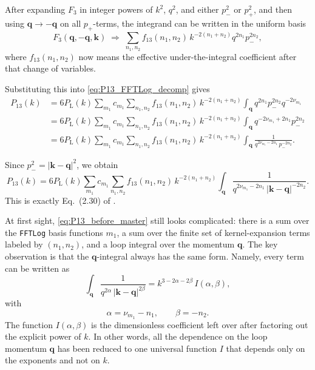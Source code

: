 \documentclass[a4paper,11pt]{article}
\newcommand{\codefont}[1]{{\texttt{#1}}}
\def\Plin{P_{\rm L}}
\newcommand{\<}{\langle}
\renewcommand{\>}{\rangle}
\def\Plin{P_\text{L}}
\begin{document}
After expanding \(F_3\) in integer powers of \(k^2\), \(q^2\), and either \(p_-^2\) or \(p_+^2\), and then using \(\mathbf q\to-\mathbf q\) on all \(p_+\)-terms, the integrand can be written in the uniform basis
\begin{equation}
F_3(\mathbf q,-\mathbf q,\mathbf k)
\;\Longrightarrow\;
\sum_{n_1,n_2}
f_{13}(n_1,n_2)\,
k^{-2(n_1+n_2)} q^{2n_1} p_-^{2n_2},
\end{equation}
where \(f_{13}(n_1,n_2)\) now means the effective under-the-integral coefficient after that change of variables.

Substituting this into \cref{eq:P13_FFTLog_decomp} gives
\begin{align}
P_{13}(k)
&=
6 \Plin(k)
\sum_{m_1} c_{m_1}
\sum_{n_1,n_2}
f_{13}(n_1,n_2)\,
k^{-2(n_1+n_2)}
\int_{\mathbf q}
q^{2n_1} p_-^{2n_2} q^{-2\nu_{m_1}}
\nonumber\\
&=
6 \Plin(k)
\sum_{m_1} c_{m_1}
\sum_{n_1,n_2}
f_{13}(n_1,n_2)\,
k^{-2(n_1+n_2)}
\int_{\mathbf q}
q^{-2\nu_{m_1}+2n_1} p_-^{2n_2}
\nonumber\\
&=
6 \Plin(k)
\sum_{m_1} c_{m_1}
\sum_{n_1,n_2}
f_{13}(n_1,n_2)\,
k^{-2(n_1+n_2)}
\int_{\mathbf q}
\frac{1}{q^{2\nu_{m_1}-2n_1}\,p_-^{-2n_2}}.
\end{align}

Since \(p_-^2=|\mathbf k-\mathbf q|^2\), we obtain
\begin{equation}
P_{13}(k)
=
6 \Plin(k)
\sum_{m_1} c_{m_1}
\sum_{n_1,n_2}
f_{13}(n_1,n_2)\,
k^{-2(n_1+n_2)}
\int_{\mathbf q}
\frac{1}{q^{2\nu_{m_1}-2n_1}\,|\mathbf k-\mathbf q|^{-2n_2}}.
\label{eq:P13_before_master}
\end{equation}
This is exactly Eq.~(2.30) of \cite{Simonovic:2017mhp}.

At first sight, \cref{eq:P13_before_master} still looks complicated: there is a sum over the \codefont{FFTLog} basis functions \(m_1\), a sum over the finite set of kernel-expansion terms labeled by \((n_1,n_2)\), and a loop integral over the momentum \(\mathbf q\). The key observation is that the \(\mathbf q\)-integral always has the same form. Namely, every term can be written as
\begin{equation}
\int_{\mathbf q}
\frac{1}{q^{2\alpha}\,|\mathbf k-\mathbf q|^{2\beta}}
=
k^{3-2\alpha-2\beta}\,I(\alpha,\beta),
\label{eq:master_int}
\end{equation}
with
\begin{equation}
\alpha=\nu_{m_1}-n_1,
\qquad
\beta=-n_2.
\end{equation}
The function \(I(\alpha,\beta)\) is the dimensionless coefficient left over after factoring out the explicit power of \(k\). In other words, all the dependence on the loop momentum \(\mathbf q\) has been reduced to one universal function \(I\) that depends only on the exponents and not on \(k\).
\end{document}
